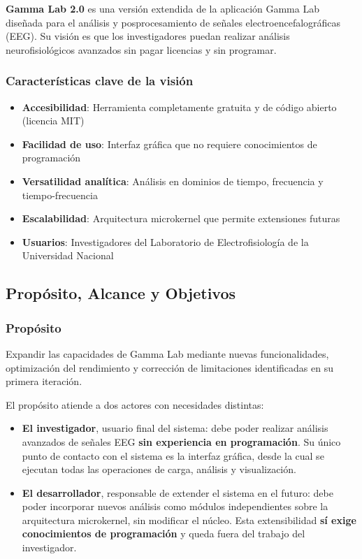 \documentclass{article}
\begin{document}
\textbf{Gamma Lab 2.0} es una versión extendida de la aplicación Gamma Lab diseñada para el análisis y posprocesamiento de señales electroencefalográficas (EEG). Su visión es que los investigadores puedan realizar análisis neurofisiológicos avanzados sin pagar licencias y sin programar.
 
\subsubsection{Características clave de la visión}
 
\begin{itemize}
    \item \textbf{Accesibilidad}: Herramienta completamente gratuita y de código abierto (licencia MIT)
    \item \textbf{Facilidad de uso}: Interfaz gráfica que no requiere conocimientos de programación
    \item \textbf{Versatilidad analítica}: Análisis en dominios de tiempo, frecuencia y tiempo-frecuencia
    \item \textbf{Escalabilidad}: Arquitectura microkernel que permite extensiones futuras
    \item \textbf{Usuarios}: Investigadores del Laboratorio de Electrofisiología de la Universidad Nacional
\end{itemize}
 
\subsection{Propósito, Alcance y Objetivos}
 
\subsubsection{Propósito}
 
Expandir las capacidades de Gamma Lab mediante nuevas funcionalidades, optimización del rendimiento y corrección de limitaciones identificadas en su primera iteración.

El propósito atiende a dos actores con necesidades distintas:

\begin{itemize}
    \item \textbf{El investigador}, usuario final del sistema: debe poder realizar análisis avanzados de señales EEG \textbf{sin experiencia en programación}. Su único punto de contacto con el sistema es la interfaz gráfica, desde la cual se ejecutan todas las operaciones de carga, análisis y visualización.

    \item \textbf{El desarrollador}, responsable de extender el sistema en el futuro: debe poder incorporar nuevos análisis como módulos independientes sobre la arquitectura microkernel, sin modificar el núcleo. Esta extensibilidad \textbf{sí exige conocimientos de programación} y queda fuera del trabajo del investigador.
\end{itemize}
\end{document}
